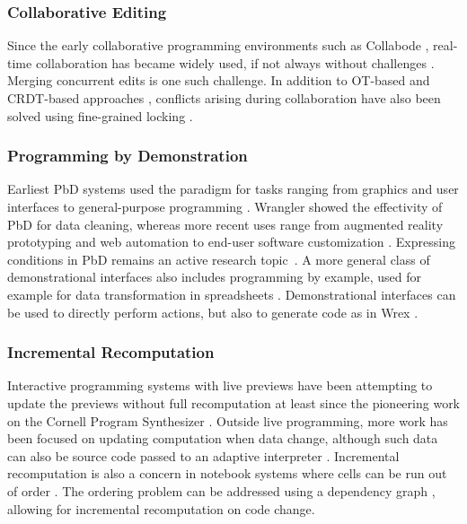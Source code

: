 \documentclass[sigconf,anonymous,screen]{acmart}
\begin{document}
\subsubsection*{Collaborative Editing}
Since the early collaborative programming environments such as Collabode \cite{goldman-2011-collaborative},
real-time collaboration has became widely used, if not always without challenges \cite{tan-2024-vslive}.
Merging concurrent edits is one such challenge. In addition to OT-based and CRDT-based
approaches \cite{klokmose-2024-mywebstrates}, conflicts arising during
collaboration have also been solved using fine-grained locking \cite{wang-2024-nbconflicts}.

\subsubsection*{Programming by Demonstration}
Earliest PbD systems used the paradigm for tasks ranging from graphics
and user interfaces to general-purpose programming \cite{smith-1975-pygmalion,cypher-1993-pbd}.
Wrangler \cite{kandel-2011-wrangler} showed the effectivity of PbD for data cleaning,
whereas more recent uses range from augmented reality prototyping \cite{leiva-2021-rapido}
and web automation \cite{chen-2023-miwa} to end-user software customization
\cite{litt-2020-customization,litt-2020-wildcard}. Expressing conditions in PbD remains an
active research topic~\cite{pu-2022-semanticon,radensky-2018-conditionals}. A more general class of demonstrational
interfaces \cite{myers-2000-intelligence} also includes programming by example, used
for example for data transformation in spreadsheets \cite{gulwani-2012-spreadsheets}.
Demonstrational interfaces can be used to directly perform actions, but also to generate code
as in Wrex \cite{drossos-2020-wrex}.

\subsubsection*{Incremental Recomputation}
Interactive programming systems with live previews \cite{petricek-2020-live,mcdirmid-2013-usable}
have been attempting to update the previews without full recomputation at least since the pioneering
work on the Cornell Program Synthesizer \cite{teitelbaum-1981-cps}. Outside live programming,
more work has been focused on updating computation when data change, although such data can also
be source code passed to an adaptive interpreter \cite{acar-2006-adaptive}.
Incremental recomputation is also a concern in notebook systems where cells can be run out of
order \cite{singer-2020-jollity}. The ordering problem can be addressed using a dependency graph
\cite{petricek-2018-wrattler,koop-2017-dataflow}, allowing for incremental recomputation
on code change.
\end{document}
